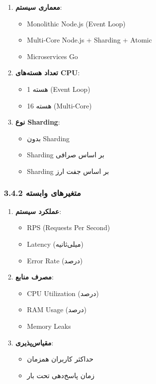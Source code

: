 \documentclass[
]{article}
\providecommand{\tightlist}{%
  \setlength{\itemsep}{0pt}\setlength{\parskip}{0pt}}
\begin{document}
\begin{enumerate}
\def\labelenumi{\arabic{enumi}.}
\item
  \textbf{معماری سیستم}:

  \begin{itemize}
  \tightlist
  \item
    Monolithic Node.js (Event Loop)
  \item
    Multi-Core Node.js + Sharding + Atomic
  \item
    Microservices Go
  \end{itemize}
\item
  \textbf{تعداد هسته‌های CPU}:

  \begin{itemize}
  \tightlist
  \item
    1 هسته (Event Loop)
  \item
    16 هسته (Multi-Core)
  \end{itemize}
\item
  \textbf{نوع Sharding}:

  \begin{itemize}
  \tightlist
  \item
    بدون Sharding
  \item
    Sharding بر اساس صرافی
  \item
    Sharding بر اساس جفت ارز
  \end{itemize}
\end{enumerate}

\subsubsection{3.4.2 متغیرهای
وابسته}\label{ux645ux62aux63aux6ccux631ux647ux627ux6cc-ux648ux627ux628ux633ux62aux647}

\begin{enumerate}
\def\labelenumi{\arabic{enumi}.}
\item
  \textbf{عملکرد سیستم}:

  \begin{itemize}
  \tightlist
  \item
    RPS (Requests Per Second)
  \item
    Latency (میلی‌ثانیه)
  \item
    Error Rate (درصد)
  \end{itemize}
\item
  \textbf{مصرف منابع}:

  \begin{itemize}
  \tightlist
  \item
    CPU Utilization (درصد)
  \item
    RAM Usage (درصد)
  \item
    Memory Leaks
  \end{itemize}
\item
  \textbf{مقیاس‌پذیری}:

  \begin{itemize}
  \tightlist
  \item
    حداکثر کاربران همزمان
  \item
    زمان پاسخ‌دهی تحت بار
  \end{itemize}
\end{enumerate}
\end{document}

